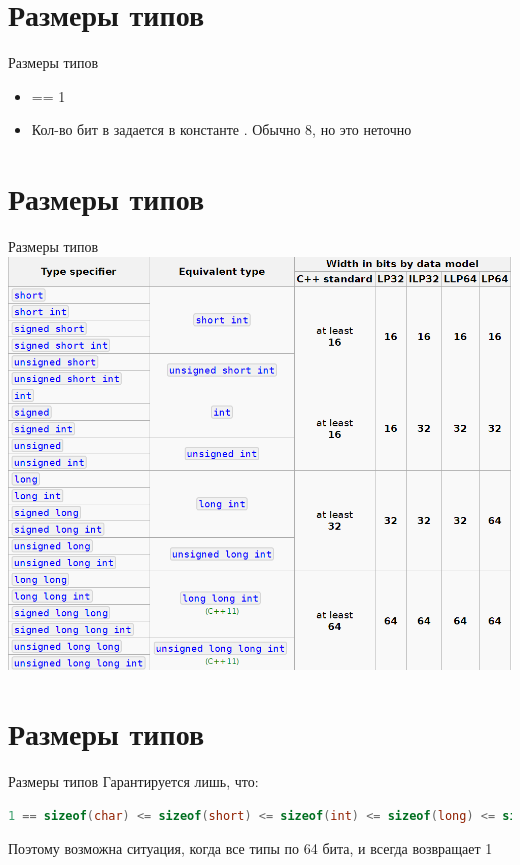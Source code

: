 \documentclass[10pt]{beamer}
\begin{document}
\section{Размеры типов}
\begin{frame}[fragile]{Размеры типов}
\begin{itemize}
\item{ == 1}
\pause
\item{Кол-во бит в  задается в константе . Обычно 8, но это неточно}
\end{itemize}
\end{frame}

\section{Размеры типов}
\begin{frame}[fragile]{Размеры типов}
\includegraphics[scale=0.35]{Term_3/Source/Pictures/TypesRanges.png}
\end{frame}

\section{Размеры типов}
\begin{frame}[fragile]{Размеры типов}
Гарантируется лишь, что:
\begin{lstlisting}[language=C++]
1 == sizeof(char) <= sizeof(short) <= sizeof(int) <= sizeof(long) <= sizeof(long long)
\end{lstlisting}
\pause
Поэтому возможна ситуация, когда все типы по 64 бита, и  всегда возвращает 1
\end{frame}
\end{document}
